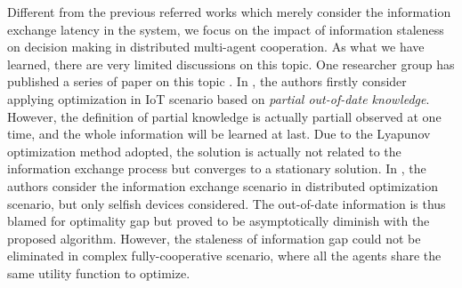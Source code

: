 Different from the previous referred works which merely consider the information exchange latency in the system, we focus on the impact of information staleness on decision making in distributed multi-agent cooperation.
As what we have learned, there are very limited discussions on this topic.
One researcher group has published a series of paper on this topic \cite{JSAC17-LyuX,TWC18-LyuX}.
In \cite{JSAC17-LyuX}, the authors firstly consider applying optimization in IoT scenario based on \emph{partial out-of-date knowledge}.
However, the definition of partial knowledge is actually partiall observed at one time, and the whole information will be learned at last.
Due to the Lyapunov optimization method adopted, the solution is actually not related to the information exchange process but converges to a stationary solution.
In \cite{TWC18-LyuX}, the authors consider the information exchange scenario in distributed optimization scenario, but only selfish devices considered.
The out-of-date information is thus blamed for optimality gap but proved to be asymptotically diminish with the proposed algorithm.
However, the staleness of information gap could not be eliminated in complex fully-cooperative scenario, where all the agents share the same utility function to optimize.

